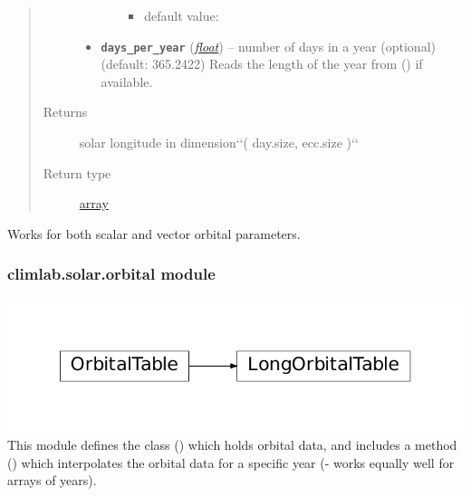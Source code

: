 \documentclass[a4paper,10pt,english]{sphinxmanual}
\begin{document}
\begin{fulllineitems}
\begin{quote}
\begin{description}
\begin{itemize}
\begin{itemize}
\begin{itemize}
\item {} 
default value: 

\end{itemize}

\end{itemize}


\item {} 
\textbf{\texttt{days\_per\_year}} (\href{http://docs.python.org/2.7/library/functions.html\#float}{\emph{float}}) -- number of days in a year (optional) 
(default: 365.2422)
Reads the length of the year from 
{\hyperref[api/climlab.utils:module\string-climlab.utils.constants]{\emph{}}} () if available.

\end{itemize}

\item[{Returns}] \leavevmode
solar longitude 
in dimension{}`{}`( day.size, ecc.size ){}`{}`

\item[{Return type}] \leavevmode
\href{http://docs.python.org/2.7/library/array.html\#module-array}{array}

\end{description}\end{quote}

Works for both scalar and vector orbital parameters.

\end{fulllineitems}



\subsubsection{climlab.solar.orbital module}
\label{api/climlab.solar:climlab-solar-orbital-module}
\includegraphics{inheritance-a4659f72efbfa1da05c43c93e29674e4f4358872.pdf}
\label{api/climlab.solar:module-climlab.solar.orbital}
This module defines the class {\hyperref[api/climlab.solar:climlab.solar.orbital.OrbitalTable]{\emph{}}} () which holds orbital data,
and includes a method {\hyperref[api/climlab.solar:climlab.solar.orbital.OrbitalTable.lookup_parameters]{\emph{}}} () 
which interpolates the orbital data for a specific year 
(- works equally well for arrays of years).
\end{document}
